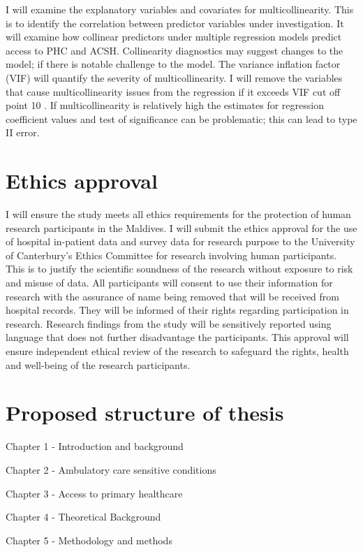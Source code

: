 I will examine the explanatory variables and covariates for multicollinearity. This is to identify the correlation between predictor variables under investigation. It will examine how collinear predictors under multiple regression models predict access to PHC and ACSH. Collinearity diagnostics may suggest changes to the model; if there is notable challenge to the model. The variance inflation factor (VIF) will quantify the severity of multicollinearity. I will remove the variables that cause multicollinearity issues from the regression if it exceeds VIF cut off point 10 \cite{neter1996applied}. If multicollinearity is relatively high the estimates for regression coefficient values and test of significance can be problematic; this can lead to type II error. 

 \section{Ethics approval}
 
 I will ensure the study meets all ethics requirements for the protection of human research participants in the Maldives. I will submit the ethics approval for the use of hospital in-patient data and survey data for research purpose to the University of Canterbury's Ethics Committee for research involving human participants. This is to justify the scientific soundness of the research without exposure to risk and misuse of data. All participants will consent to use their information for research with the assurance of name being removed that will be received from hospital records. They will be informed of their rights regarding participation in research. Research findings from the study will be sensitively reported using language that does not further disadvantage the participants. This approval will ensure independent ethical review of the research to safeguard the rights, health and well-being of the research participants.
 
 \section{Proposed structure of thesis}
 
Chapter 1 - Introduction and background

Chapter 2 - Ambulatory care sensitive conditions

Chapter 3 - Access to primary healthcare

Chapter 4 - Theoretical Background 

Chapter 5 - Methodology and methods 

